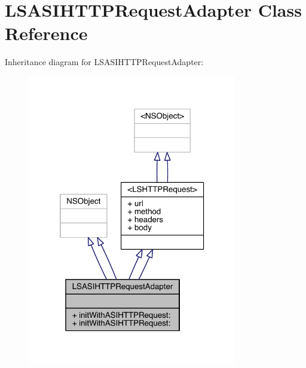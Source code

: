 \hypertarget{interface_l_s_a_s_i_h_t_t_p_request_adapter}{\section{L\-S\-A\-S\-I\-H\-T\-T\-P\-Request\-Adapter Class Reference}
\label{interface_l_s_a_s_i_h_t_t_p_request_adapter}
}


Inheritance diagram for L\-S\-A\-S\-I\-H\-T\-T\-P\-Request\-Adapter\-:\nopagebreak
\begin{figure}[H]
\begin{center}
\leavevmode
\includegraphics[width=259pt]{interface_l_s_a_s_i_h_t_t_p_request_adapter__inherit__graph}
\end{center}
\end{figure}


